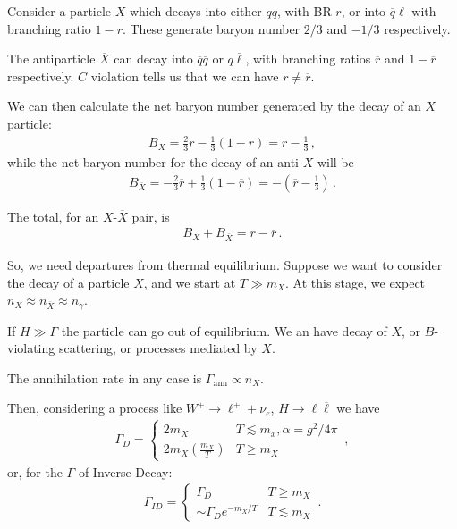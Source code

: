 \documentclass[main.tex]{subfiles}
\begin{document}
Consider a particle \(X\) which decays into either \(qq\), with BR \(r\), or into \(\overline{q} \ell\) with branching ratio \(1 - r\). 
These generate baryon number \(2/3\) and \(-1/3\) respectively.

The antiparticle \(\overline{X}\) can decay into \(\overline{q} \overline{q}\) or \(q \overline{\ell}\), with branching ratios \(\overline{r}\) and \(1 - \overline{r}\) respectively. 
\(C\) violation tells us that we can have \(r \neq \overline{r}\).

We can then calculate the net baryon number generated by the decay of an \(X\) particle: 
%
\begin{align}
B_X = \frac{2}{3} r - \frac{1}{3} (1 - r) = r - \frac{1}{3}
\,,
\end{align}
%
while the net baryon number for the decay of an anti-\(X\) will be 
%
\begin{align}
B_{\overline{X}} = -  \frac{2}{3} \overline{r} + \frac{1}{3} (1 - \overline{r}) = - (\overline{r} - \frac{1}{3})
\,.
\end{align}

The total, for an \(X\)-\(\overline{X}\) pair, is
%
\begin{align}
B_X + B_{\overline{X}} = r - \overline{r}
\,.
\end{align}

So, we need departures from thermal equilibrium. 
Suppose we want to consider the decay of a particle \(X\), and we start at \(T \gg m_X\). 
At this stage, we expect \(n_X \approx n_{\overline{X}} \approx n_\gamma\). 

If \(H \gg \Gamma \) the particle can go out of equilibrium. 
We an have decay of \(X\), or \(B\)-violating scattering, or processes mediated by \(X\). 

The annihilation rate in any case is \(\Gamma _{\text{ann}} \propto n_X\). 

Then, considering a process like \(W^{+} \to \ell^{+} + \nu _e\), \(H \to \ell \overline{\ell}\)
we have 
%
\begin{align}
\Gamma _D = 
\begin{cases}
    2 m_X & T \lesssim m_x, \alpha = g^2 / 4 \pi \\
    2 m_X ( \frac{m_X}{T}) & T \geq m_X
\end{cases}
\,,
\end{align}
%
or, for the \(\Gamma \) of Inverse Decay:
%
\begin{align}
\Gamma_{ID} = \begin{cases}
    \Gamma _D & T \geq m_X \\
    \sim \Gamma _D e^{- m_X / T} & T \lesssim m_X
\end{cases}
\,.
\end{align}
\end{document}
